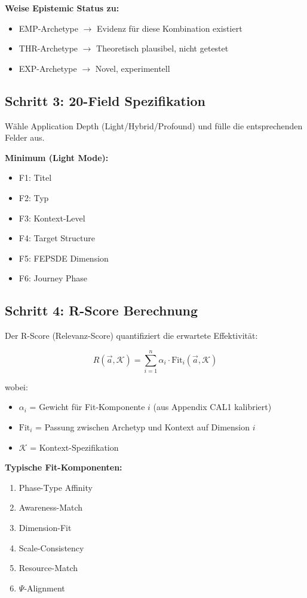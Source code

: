 \textbf{Weise Epistemic Status zu:}
\begin{itemize}[nosep]
\item EMP-Archetype $\rightarrow$ Evidenz für diese Kombination existiert
\item THR-Archetype $\rightarrow$ Theoretisch plausibel, nicht getestet
\item EXP-Archetype $\rightarrow$ Novel, experimentell
\end{itemize}


\subsection{Schritt 3: 20-Field Spezifikation}

Wähle Application Depth (Light/Hybrid/Profound) und fülle die entsprechenden Felder aus.

\textbf{Minimum (Light Mode):}
\begin{itemize}[nosep]
\item F1: Titel
\item F2: Typ
\item F3: Kontext-Level
\item F4: Target Structure
\item F5: FEPSDE Dimension
\item F6: Journey Phase
\end{itemize}


\subsection{Schritt 4: R-Score Berechnung}

Der R-Score (Relevanz-Score) quantifiziert die erwartete Effektivität:

\begin{equation}
R(\vec{a}, \mathcal{K}) = \sum_{i=1}^{n} \alpha_i \cdot \text{Fit}_i(\vec{a}, \mathcal{K})
\label{eq:17-rscore}
\end{equation}

wobei:
\begin{itemize}[nosep]
\item $\alpha_i$ = Gewicht für Fit-Komponente $i$ (aus Appendix CAL1 kalibriert)
\item $\text{Fit}_i$ = Passung zwischen Archetyp und Kontext auf Dimension $i$
\item $\mathcal{K}$ = Kontext-Spezifikation
\end{itemize}

\textbf{Typische Fit-Komponenten:}
\begin{enumerate}[nosep]
\item Phase-Type Affinity
\item Awareness-Match
\item Dimension-Fit
\item Scale-Consistency
\item Resource-Match
\item $\Psi$-Alignment
\end{enumerate}



